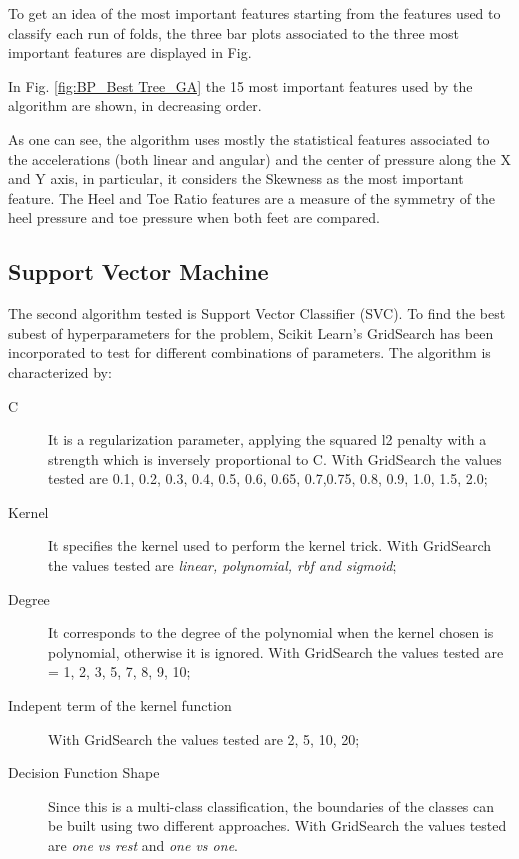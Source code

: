 To get an idea of the most important features starting from the features used to classify each run of folds, the three bar plots associated to the three most important features are displayed in Fig.



In Fig. \ref{fig:BP_Best Tree_GA} the 15 most important features used by the algorithm are shown, in decreasing order.

As one can see, the algorithm uses mostly the statistical features associated to the accelerations (both linear and angular) and the center of pressure along the X and Y axis, in particular, it considers the Skewness as the most important feature.
The Heel and Toe Ratio features are a measure of the symmetry of the heel pressure and toe pressure when both feet are compared.

\subsection{Support Vector Machine}
The second algorithm tested is Support Vector Classifier (SVC). 
To find the best subest of hyperparameters for the problem, Scikit Learn's GridSearch has been incorporated to test for different combinations of parameters.
The algorithm is characterized by:
\begin{description}
    \item[C] It is a regularization parameter, applying the squared l2 penalty with a strength which is inversely proportional to C. With GridSearch the values tested are 0.1, 0.2, 0.3, 0.4, 0.5, 0.6, 0.65, 0.7,0.75, 0.8, 0.9, 1.0, 1.5, 2.0;
    \item[Kernel] It specifies the kernel used to perform the kernel trick. With GridSearch the values tested are \textit{linear, polynomial, rbf and sigmoid};
    \item[Degree] It corresponds to the degree of the polynomial when the kernel chosen is polynomial, otherwise it is ignored. With GridSearch the values tested are = 1, 2, 3, 5, 7, 8, 9, 10;
    \item[Indepent term of the kernel function]  With GridSearch the values tested are 2, 5, 10, 20;
    \item[Decision Function Shape] Since this is a multi-class classification, the boundaries of the classes can be built using two different approaches. With GridSearch the values tested are \textit{one vs rest} and \textit{one vs one}.
\end{description}

